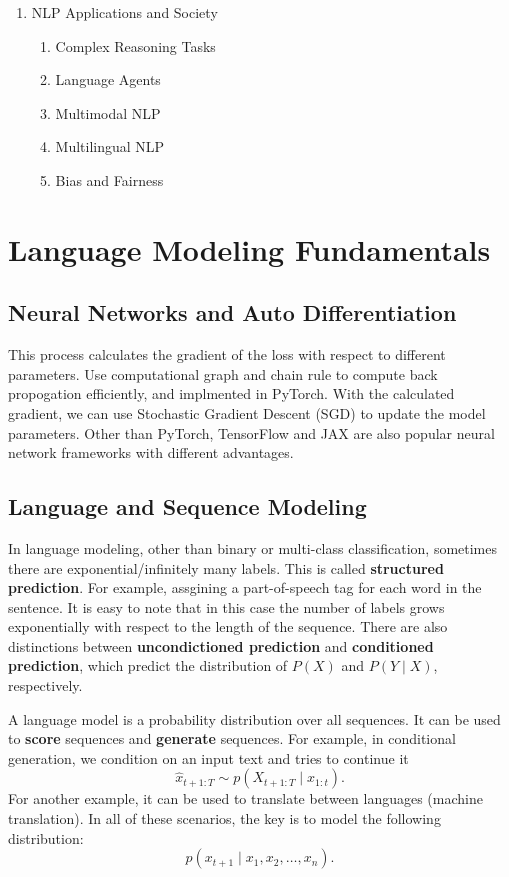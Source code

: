 \documentclass[a4paper]{article}
\begin{document}
\begin{enumerate}
  \item NLP Applications and Society
  \begin{enumerate}
    \item Complex Reasoning Tasks
    \item Language Agents
    \item Multimodal NLP
    \item Multilingual NLP
    \item Bias and Fairness
  \end{enumerate}
\end{enumerate}

\section{Language Modeling Fundamentals}

\subsection{Neural Networks and Auto Differentiation}
This process calculates the gradient of the loss with 
respect to different parameters. Use computational graph 
and chain rule to compute back propogation efficiently, 
and implmented in PyTorch. With the calculated gradient, 
we can use Stochastic Gradient Descent (SGD) to update 
the model parameters. 
Other than PyTorch, TensorFlow and JAX are also popular 
neural network frameworks with different advantages.

\subsection{Language and Sequence Modeling} 

In language modeling, other than binary or multi-class 
classification, sometimes there are exponential/infinitely
many labels. This is called \textbf{structured prediction}. 
For example, assgining a part-of-speech tag for each word in the 
sentence. It is easy to note that in this case the number 
of labels grows exponentially with respect to the length 
of the sequence.
There are also distinctions between \textbf{uncondictioned 
prediction} and \textbf{conditioned prediction}, which predict 
the distribution of $P(X)$ and $P(Y \mid X)$, respectively.

A language model is a probability distribution over all 
sequences. It can be used to \textbf{score} sequences
and \textbf{generate} sequences. For example, in 
conditional generation, we condition on an input text and 
tries to continue it 
\[
\hat{x}_{t + 1: T} \sim p(X_{t+1: T} \mid x_{1 : t}).
\]
For another example, it can be used to translate between 
languages (machine translation). In all of these scenarios, 
the key is to model the following distribution:
\[
p(x_{t + 1} \mid x_1, x_2, \dots, x_n).
\]
\end{document}
